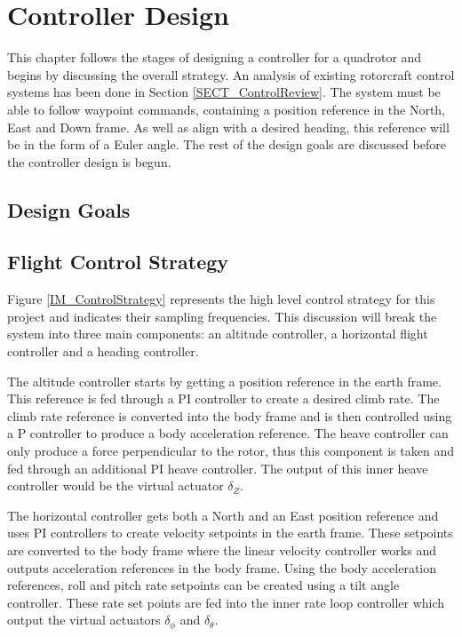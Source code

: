 \chapter{Controller Design}
	 This chapter follows the stages of designing a controller for a quadrotor and begins by discussing the overall strategy. An analysis of existing rotorcraft control systems has been done in Section \ref{SECT_ControlReview}. The system must be able to follow waypoint commands, containing a position reference in the North, East and Down frame. As well as align with a desired heading, this reference will be in the form of a Euler angle. The rest of the design goals are discussed before the controller design is begun.
	 
	 \section{Design Goals}
	 
	 
	 \section{Flight Control Strategy}
	 Figure \ref{IM_ControlStrategy} represents the high level control strategy for this project and indicates their sampling frequencies. This discussion will break the system into three main components: an altitude controller, a horizontal flight controller and a heading controller.	
	 
	 The altitude controller starts by getting a position reference in the earth frame. This reference is fed through a PI controller to create a desired climb rate. The climb rate reference is converted into the body frame and is then controlled using a P controller to produce a body acceleration reference. The heave controller can only produce a force perpendicular to the rotor, thus this component is taken and fed through an additional PI heave controller. The output of this inner heave controller would be the virtual actuator $\delta_Z$.
	 
	 The horizontal controller gets both a North and an East position reference and uses PI controllers to create velocity setpoints in the earth frame. These setpoints are converted to the body frame where the linear velocity controller works and outputs acceleration references in the body frame. Using the body acceleration references, roll and pitch rate setpoints can be created using a tilt angle controller. These rate set points are fed into the inner rate loop controller which output the virtual actuators $\delta_\phi$ and $\delta_\theta$.
	 
